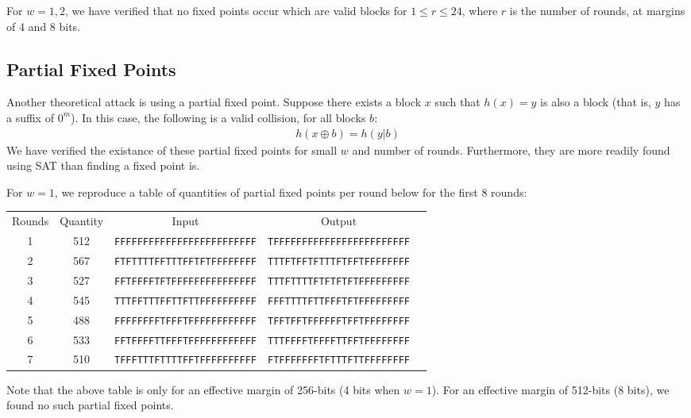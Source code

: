 \documentclass[10pt,twocolumn,twoside]{pnas-new}
\begin{document}
For $w=1, 2$, we have verified that no fixed points occur which are valid blocks
for $1 \leq r \leq 24$, where $r$ is the number of rounds, at margins of 4 and
8 bits.




\subsection{Partial Fixed Points} \label{sec:f:partial}

Another theoretical attack is using a partial fixed point. Suppose there
exists a block $x$ such that $h(x) = y$ is also a block (that is, $y$ has
a suffix of $0^{m}$). In this case, the following is a valid collision,
for all blocks $b$:
\begin{align*}
    h(x \oplus b) = h(y | b)
\end{align*}
We have verified the existance of these partial fixed points for small
$w$ and number of rounds. Furthermore, they are more readily found using SAT
than finding a fixed point is.

For $w=1$, we reproduce a table of quantities of partial fixed points per round
below for the first 8 rounds:

\begin{tabular}{c c c c c} \label{tab:f:p:1}
    Rounds & Quantity & Input & Output \\
    1 & 512 & \texttt{FFFFFFFFFFFFFFFFFFFFFFFFF} & \texttt{TFFFFFFFFFFFFFFFFFFFFFFFF} \\
    2 & 567 & \texttt{FTFTTTTFFTTTFFTFTFFFFFFFF} & \texttt{TTTFTFFTFTTTFTFFTFFFFFFFF} \\
    3 & 527 & \texttt{FFTFFFFTFTFFFFFFFFFFFFFFF} & \texttt{TTTFTTTTFTFTFTFTFFFFFFFFF} \\
    4 & 545 & \texttt{TTTFFTTTFFTTFTTFFFFFFFFFF} & \texttt{FFFTTTTFTTFFFTFTFFFFFFFFF} \\
    5 & 488 & \texttt{FFFFFFFFTFFFTFFFFFFFFFFFF} & \texttt{TFFTFFTFFFFFFTFFTFFFFFFFF} \\
    6 & 533 & \texttt{FFTFFFFTTFFFTFFFFFFFFFFFF} & \texttt{TTTFFFFTFFFFTTFFTFFFFFFFF} \\
    7 & 510 & \texttt{TFFFTTTFTTTTFFTFFFFFFFFFF} & \texttt{FTFFFFFFFTFTTTFTTFFFFFFFF} \\
\end{tabular}

Note that the above table is only for an effective margin of 256-bits (4 bits
when $w=1$). For an effective margin of 512-bits (8 bits), we found no such
partial fixed points.
\end{document}
